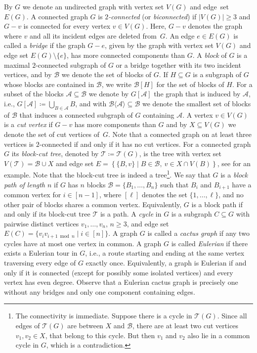 \documentclass[12pt]{amsart}
\newcommand{\T}{\mathcal{T}}
\newcommand{\B}{\mathcal{B}}
\newcommand{\A}{\mathcal{A}}
\newcommand{\Xn}[1]{{\protect#1}}
\begin{document}
By $G$ we denote an undirected graph with vertex set $V(G)$ and edge~set~$E(G)$. A connected graph $G$ is \emph{$2$-connected} (or \emph{biconnected}) if $\vert V(G) \vert \ge 3$ and $G-v$ is connected for every vertex $v \in V(G)$. Here, $G-v$ denotes the graph where $v$ and all its incident edges are deleted from~$G$. An edge $e \in E(G)$ is called a \emph{bridge} if the graph $G-e$, given by the graph with vertex set $V(G)$ and edge set $E(G) \setminus \{e\}$, has more connected components than $G$. A \emph{block} of $G$ is a maximal $2$-connected subgraph of $G$ or a bridge together with its two incident vertices, and by $\B$ we denote the set of blocks of $G$. If $H \subseteq G$ is a subgraph of $G$ whose blocks are contained in $\B$, we write $\B[H]$ for the set of blocks of $H$. For a subset of the blocks $\A \subseteq \B$ we denote by $G[\A]$ the graph that is induced by $\A$, i.e., $G[\A] \coloneqq \bigcup_{B \in \A}B$, and  with $\B \langle \A \rangle \subseteq \B$ we denote the smallest set of blocks of $\B$ that induces a connected subgraph of $G$ containing $\A$. A vertex $v \in V(G)$ is a \emph{cut vertex} if $G-v$ has more components than $G$ and by $X \subseteq V(G)$ we denote the set of cut vertices of~$G$. Note that a connected graph on at least three vertices is $2$-connected if and only if it has no cut vertices. For a connected graph $G$ its \emph{block-cut tree}, denoted by $\T\coloneqq \T(G)$, is the tree with vertex set $V(\T)=\B\cup X$ and edge set $E = \left\{ \{B,v\} \mid B \in \B, \ v \in X \cap V(B) \right\}$\Xn{, see  for an example}. Note that the block-cut tree is indeed a tree\footnote{\Xn{The connectivity is immediate. Suppose there is a cycle in $\T(G)$. Since all edges of $\T(G)$ are between $X$ and $\B$, there are at least two cut vertices $v_1,v_2 \in X$, that belong to this cycle. But then $v_1$ and $v_2$ also lie in a common cycle in $G$, which is a contradiction.}}. We say that $G$ is a \emph{block path of length $n$} if $G$ has $n$ blocks $\B=\{B_1,\ldots,B_n\}$ such that $B_i$ and $B_{i+1}$ have a common vertex for $i \in [n-1]$, where $[\ell]$ denotes the set $\{1,\ldots,\ell\}$, and no other pair of blocks shares a common vertex. Equivalently, $G$ is a block path if and only if its block-cut tree $\T$ is a path. A \emph{cycle} in $G$ is a subgraph $C \subseteq G$ with pairwise distinct vertices $v_1,\ldots,v_n$, $n \ge 3$, and edge set $E(C)=\{v_iv_{i+1 \bmod n} \mid i \in [n]\}$. A graph $G$ is called a \emph{cactus graph} if any two cycles have at most one vertex in common. A graph $G$ is called \emph{Eulerian} if there exists a Eulerian tour in $G$, i.e., a route starting and ending at the same vertex traversing every edge of $G$ exactly once. Equivalently, a graph is Eulerian if and only if it is connected (except for possibly some isolated vertices) and every vertex has even degree. Observe that a Eulerian cactus graph is precisely one without any bridges and only one component containing edges.
\end{document}
